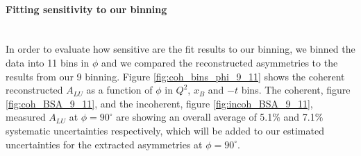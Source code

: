 \paragraph{Fitting sensitivity to our binning}
~\\

In order to evaluate how sensitive are the fit results to our binning, we 
binned the data into 11 bins in $\phi$ and we compared the reconstructed 
asymmetries to the results from our 9 binning. Figure 
\ref{fig:coh_bins_phi_9_11} shows the coherent reconstructed $A_{LU}$ as a 
function of $\phi$ in $Q^{2}$, $x_B$ and $-t$ bins.  The coherent, figure 
\ref{fig:coh_BSA_9_11}, and the incoherent, figure \ref{fig:incoh_BSA_9_11}, 
measured $A_{LU}$ at $\phi = 90 ^{\circ}$ are showing an overall average of 
5.1$\%$ and 7.1$\%$ systematic uncertainties respectively, which will be added 
to our estimated uncertainties for the extracted asymmetries at $\phi = 
90^{\circ}$.




